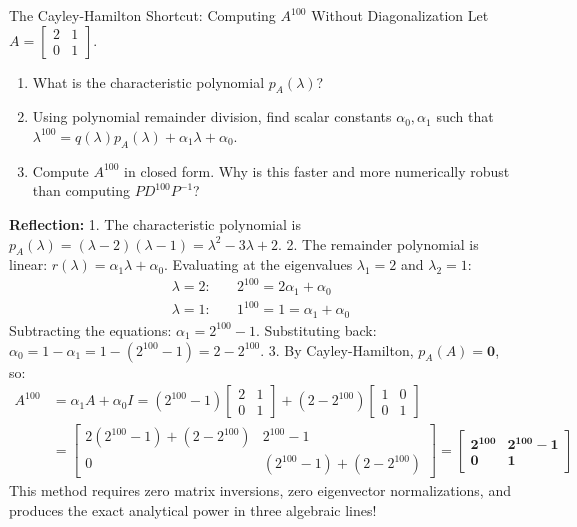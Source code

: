 \begin{ponderbox}{The Cayley-Hamilton Shortcut: Computing $A^{100}$ Without Diagonalization}
Let $A = \begin{bmatrix} 2 & 1 \\ 0 & 1 \end{bmatrix}$. 
\begin{enumerate}
    \item What is the characteristic polynomial $p_A(\lambda)$?
    \item Using polynomial remainder division, find scalar constants $\alpha_0, \alpha_1$ such that $\lambda^{100} = q(\lambda)p_A(\lambda) + \alpha_1 \lambda + \alpha_0$.
    \item Compute $A^{100}$ in closed form. Why is this faster and more numerically robust than computing $P D^{100} P^{-1}$?
\end{enumerate}
\tcblower
\textbf{Reflection:}
1. The characteristic polynomial is $p_A(\lambda) = (\lambda - 2)(\lambda - 1) = \lambda^2 - 3\lambda + 2$.
2. The remainder polynomial is linear: $r(\lambda) = \alpha_1 \lambda + \alpha_0$. Evaluating at the eigenvalues $\lambda_1 = 2$ and $\lambda_2 = 1$:
\begin{align*}
\lambda = 2: \quad & 2^{100} = 2\alpha_1 + \alpha_0 \\
\lambda = 1: \quad & 1^{100} = 1 = \alpha_1 + \alpha_0
\end{align*}
Subtracting the equations: $\alpha_1 = 2^{100} - 1$.
Substituting back: $\alpha_0 = 1 - \alpha_1 = 1 - (2^{100} - 1) = 2 - 2^{100}$.
3. By Cayley-Hamilton, $p_A(A) = \mathbf{0}$, so:
\begin{align*}
A^{100} &= \alpha_1 A + \alpha_0 I = (2^{100} - 1)\begin{bmatrix} 2 & 1 \\ 0 & 1 \end{bmatrix} + (2 - 2^{100})\begin{bmatrix} 1 & 0 \\ 0 & 1 \end{bmatrix} \\
&= \begin{bmatrix} 2(2^{100} - 1) + (2 - 2^{100}) & 2^{100} - 1 \\ 0 & (2^{100} - 1) + (2 - 2^{100}) \end{bmatrix} = \begin{bmatrix} \mathbf{2^{100}} & \mathbf{2^{100} - 1} \\ \mathbf{0} & \mathbf{1} \end{bmatrix}
\end{align*}
This method requires zero matrix inversions, zero eigenvector normalizations, and produces the exact analytical power in three algebraic lines!
\end{ponderbox}


